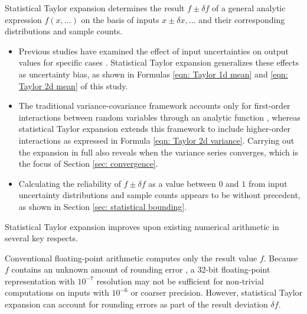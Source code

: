 \documentclass[twoside]{article}
\numberwithin{equation}{section}
\begin{document}
Statistical Taylor expansion determines the result $f \pm \delta f$ of a general analytic expression $f(x, \dots)$ on the basis of inputs $x \pm \delta x, \dots$ and their corresponding distributions and sample counts. 
\begin{itemize}
\item 
Previous studies have examined the effect of input uncertainties on output values for specific cases \cite{Lower_Order_Variance_Expansion}.
Statistical Taylor expansion generalizes these effects as uncertainty bias, as shown in Formulas \eqref{eqn: Taylor 1d mean} and \eqref{eqn: Taylor 2d mean} of this study.

\item
The traditional variance-covariance framework accounts only for first-order interactions between random variables through an analytic function \cite{Lower_Order_Variance_Expansion, Probability_Statistics, Numerical_Recipes}, whereas statistical Taylor expansion extends this framework to include higher-order interactions as expressed in Formula \eqref{eqn: Taylor 2d variance}.
Carrying out the expansion in full also reveals when the variance series converges, which is the focus of Section \ref{sec: convergence}.

\item Calculating the reliability of $f \pm \delta f$ as a value between $0$ and $1$ from input uncertainty distributions and sample counts appears to be without precedent, as shown in Section \ref{sec: statistical bounding}.
\end{itemize}

Statistical Taylor expansion improves upon existing numerical arithmetic in several key respects.

Conventional floating-point arithmetic \cite{Computer_Architecture, Floating_Point_Arithmetic, Floating_Point_Standard} computes only the result value $f$.
Because $f$ contains an unknown amount of rounding error \cite{Rounding_Error, Precise_Numerical_Methods, Algorithms_Accuracy}, a 32-bit floating-point representation with $10^{-7}$ resolution may not be sufficient for non-trivial computations on inputs with $10^{-6}$ or coarser precision.
However, statistical Taylor expansion can account for rounding errors as part of the result deviation $\delta f$.
\end{document}
